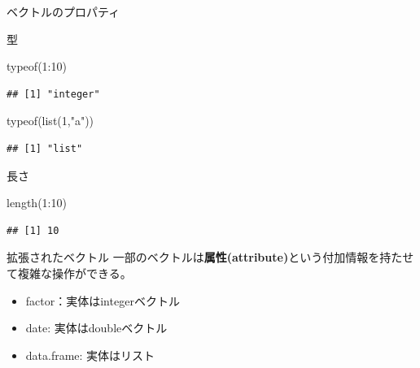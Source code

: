 \documentclass[
  ignorenonframetext,
]{beamer}
\newenvironment{Shaded}{\begin{snugshade}}{\end{snugshade}}
\newcommand{\DecValTok}[1]{\textcolor[rgb]{0.00,0.00,0.81}{#1}}
\newcommand{\FunctionTok}[1]{\textcolor[rgb]{0.00,0.00,0.00}{#1}}
\newcommand{\NormalTok}[1]{#1}
\newcommand{\SpecialCharTok}[1]{\textcolor[rgb]{0.00,0.00,0.00}{#1}}
\newcommand{\StringTok}[1]{\textcolor[rgb]{0.31,0.60,0.02}{#1}}
\providecommand{\tightlist}{%
  \setlength{\itemsep}{0pt}\setlength{\parskip}{0pt}}
\begin{document}
\begin{frame}[fragile]{ベクトルのプロパティ}
\protect\hypertarget{ux30d9ux30afux30c8ux30ebux306eux30d7ux30edux30d1ux30c6ux30a3}{}
\begin{block}{型}
\protect\hypertarget{ux578b}{}
\begin{Shaded}
\begin{Highlighting}[]
\FunctionTok{typeof}\NormalTok{(}\DecValTok{1}\SpecialCharTok{:}\DecValTok{10}\NormalTok{)}
\end{Highlighting}
\end{Shaded}

\begin{verbatim}
## [1] "integer"
\end{verbatim}

\begin{Shaded}
\begin{Highlighting}[]
\FunctionTok{typeof}\NormalTok{(}\FunctionTok{list}\NormalTok{(}\DecValTok{1}\NormalTok{,}\StringTok{"a"}\NormalTok{))}
\end{Highlighting}
\end{Shaded}

\begin{verbatim}
## [1] "list"
\end{verbatim}
\end{block}

\begin{block}{長さ}
\protect\hypertarget{ux9577ux3055}{}
\begin{Shaded}
\begin{Highlighting}[]
\FunctionTok{length}\NormalTok{(}\DecValTok{1}\SpecialCharTok{:}\DecValTok{10}\NormalTok{)}
\end{Highlighting}
\end{Shaded}

\begin{verbatim}
## [1] 10
\end{verbatim}
\end{block}
\end{frame}

\begin{frame}{拡張されたベクトル}
\protect\hypertarget{ux62e1ux5f35ux3055ux308cux305fux30d9ux30afux30c8ux30eb}{}
一部のベクトルは\textbf{属性(attribute)}という付加情報を持たせて複雑な操作ができる。

\begin{itemize}
\tightlist
\item
  factor：実体はintegerベクトル
\item
  date: 実体はdoubleベクトル
\item
  data.frame: 実体はリスト
\end{itemize}
\end{frame}
\end{document}
